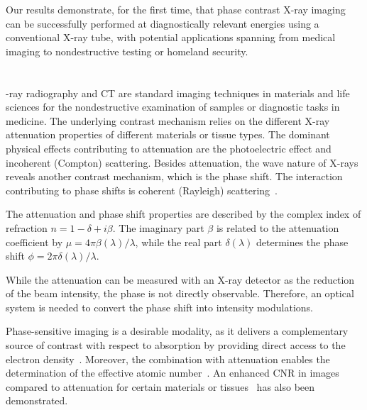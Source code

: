 \documentclass{pnastwo}
\begin{document}
\begin{article}
Our results demonstrate, for the first time, that phase contrast X-ray
imaging can be successfully performed at diagnostically relevant energies
using a conventional X-ray tube, with potential applications spanning from
medical imaging to nondestructive testing or homeland security.

\section{}
-ray radiography and CT are standard imaging techniques in
materials and life sciences for the nondestructive examination of samples or
diagnostic tasks in medicine. The underlying contrast mechanism
relies on the different X-ray attenuation properties of different materials
or tissue types. The dominant physical effects contributing to attenuation
are the photoelectric effect and incoherent (Compton) scattering. Besides attenuation, the wave
nature of X-rays reveals another contrast mechanism, which is the phase
shift. The interaction contributing to phase shifts is coherent (Rayleigh)
scattering~\cite{Als-Nielsen2011}.

The attenuation and phase shift properties are described by the complex index of refraction
$n=1-\delta + i \beta$.
The imaginary part $\beta$ is related to the
attenuation coefficient by $\mu = 4 \pi
\beta(\lambda) / \lambda$, while the real part
$\delta(\lambda)$ determines the phase shift 
$\phi = 2 \pi \delta(\lambda) / \lambda$.

While the attenuation can be measured with an
X-ray detector as the reduction of the beam intensity, the phase
is not directly observable. Therefore, an optical system is needed to
convert the phase shift into intensity modulations.

Phase-sensitive
imaging is a desirable modality, as it delivers a complementary source of
contrast with respect to absorption by providing direct access 
to the electron density~\cite{Als-Nielsen2011}. Moreover, the combination with
attenuation enables the determination of the effective atomic
number~\cite{Qi2010}.
An enhanced CNR in images compared to attenuation for certain
materials or tissues~\cite{Pfeiffer2007a,McDonald2009} has also been
demonstrated.


\end{article}
\end{document}
